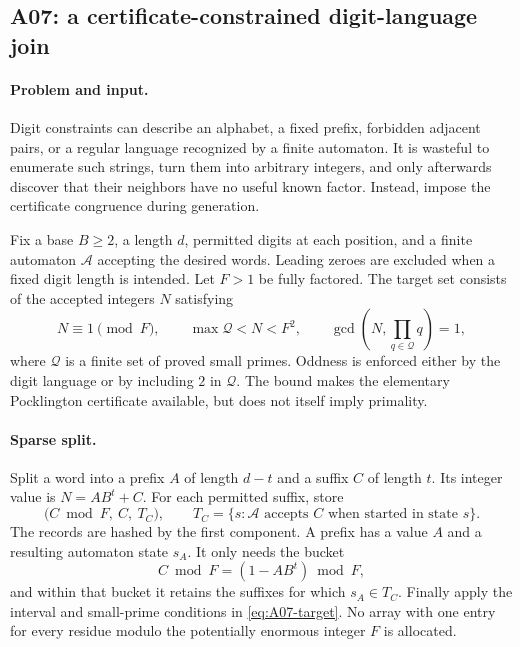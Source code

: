 \documentclass[11pt,a4paper]{article}
\theoremstyle{definition}\newtheorem{definition}[theorem]{Definition}
\theoremstyle{remark}\newtheorem{remark}[theorem]{Remark}
\begin{document}
\subsection{A07: a certificate-constrained digit-language join}
\label{alg:A07}

\paragraph{Problem and input.}
Digit constraints can describe an alphabet, a fixed prefix, forbidden
adjacent pairs, or a regular language recognized by a finite automaton.
It is wasteful to enumerate such strings, turn them into arbitrary integers,
and only afterwards discover that their neighbors have no useful known
factor. Instead, impose the certificate congruence during generation.

Fix a base $B\ge2$, a length $d$, permitted digits at each position, and a
finite automaton $\mathcal A$ accepting the desired words. Leading zeroes are
excluded when a fixed digit length is intended. Let $F>1$ be fully factored.
The target set consists of the accepted integers $N$ satisfying
\begin{equation}\label{eq:A07-target}
 N\equiv1\pmod F,\qquad
 \max\mathcal Q<N<F^2,\qquad
 \gcd\left(N,\prod_{q\in\mathcal Q}q\right)=1,
\end{equation}
where $\mathcal Q$ is a finite set of proved small primes. Oddness is enforced
either by the digit language or by including $2$ in $\mathcal Q$.
The bound makes the elementary Pocklington certificate available, but
does not itself imply primality.

\paragraph{Sparse split.}
Split a word into a prefix $A$ of length $d-t$ and a suffix $C$ of length $t$.
Its integer value is $N=AB^t+C$. For each permitted suffix, store
\[
 \bigl(C\bmod F,\ C,\ T_C\bigr),\qquad
 T_C=\{s:\mathcal A\text{ accepts }C\text{ when started in state }s\}.
\]
The records are hashed by the first component. A prefix has a value $A$
and a resulting automaton state $s_A$. It only needs the bucket
\begin{equation}\label{eq:A07-join}
 C\bmod F=(1-AB^t)\bmod F,
\end{equation}
and within that bucket it retains the suffixes for which $s_A\in T_C$.
Finally apply the interval and small-prime conditions in
\eqref{eq:A07-target}. No array with one entry for every residue modulo
the potentially enormous integer $F$ is allocated.
\end{document}
